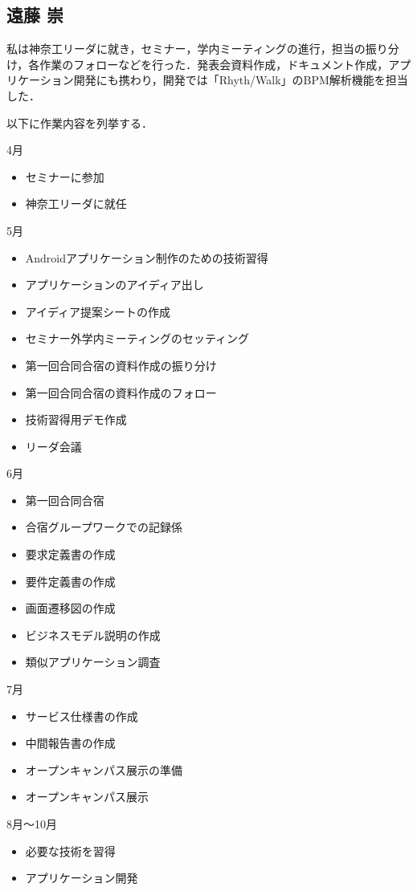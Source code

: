 \subsection{遠藤 崇}
\par 私は神奈工リーダに就き，セミナー，学内ミーティングの進行，担当の振り分け，各作業のフォローなどを行った．発表会資料作成，ドキュメント作成，アプリケーション開発にも携わり，開発では「Rhyth/Walk」のBPM解析機能を担当した．
\par 以下に作業内容を列挙する．

4月
\begin{itemize}
\item セミナーに参加
\item 神奈工リーダに就任
\end{itemize}
5月
\begin{itemize}
\item Androidアプリケーション制作のための技術習得
\item アプリケーションのアイディア出し
\item アイディア提案シートの作成
\item セミナー外学内ミーティングのセッティング
\item 第一回合同合宿の資料作成の振り分け
\item 第一回合同合宿の資料作成のフォロー
\item 技術習得用デモ作成
\item リーダ会議
\end{itemize}
6月
\begin{itemize}
\item 第一回合同合宿
\item 合宿グループワークでの記録係
\item 要求定義書の作成
\item 要件定義書の作成
\item 画面遷移図の作成
\item ビジネスモデル説明の作成
\item 類似アプリケーション調査
\end{itemize}
7月
\begin{itemize}
\item サービス仕様書の作成
\item 中間報告書の作成
\item オープンキャンパス展示の準備
\item オープンキャンパス展示
\end{itemize}
8月～10月
\begin{itemize}
\item 必要な技術を習得
\item アプリケーション開発
\end{itemize}
